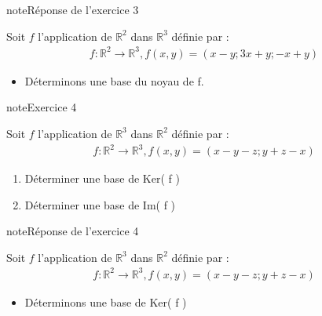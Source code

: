 \documentclass[letterpaper,10pt,french]{jupyterBook}
\begin{document}
\begin{sphinxadmonition}{note}{Réponse de l’exercice 3}

\sphinxAtStartPar
Soit \(f\) l’application de \(\mathbb{R}^2\) dans \(\mathbb{R}^3\) définie par :
\begin{equation*}
\begin{split}
f : \mathbb{R}^2 \rightarrow \mathbb{R}^3, f(x, y) = (x - y; 3x + y; -x + y )
\end{split}
\end{equation*}\begin{itemize}
\item {} 
\sphinxAtStartPar
Déterminons une base du noyau de f.

\end{itemize}
\end{sphinxadmonition}

\begin{sphinxadmonition}{note}{Exercice 4}

\sphinxAtStartPar
Soit \(f\) l’application de \(\mathbb{R}^3\) dans \(\mathbb{R}^2\) définie par :
\begin{equation*}
\begin{split}
f : \mathbb{R}^2 \rightarrow \mathbb{R}^3, f(x, y) = (x - y -z; y + z -x  )
\end{split}
\end{equation*}\begin{enumerate}
%
\item {} 
\sphinxAtStartPar
Déterminer une base de Ker( f )

\item {} 
\sphinxAtStartPar
Déterminer une base de Im( f )

\end{enumerate}
\end{sphinxadmonition}

\begin{sphinxadmonition}{note}{Réponse de l’exercice 4}

\sphinxAtStartPar
Soit \(f\) l’application de \(\mathbb{R}^3\) dans \(\mathbb{R}^2\) définie par :
\begin{equation*}
\begin{split}
f : \mathbb{R}^2 \rightarrow \mathbb{R}^3, f(x, y) = (x - y -z; y + z -x  )
\end{split}
\end{equation*}\begin{itemize}
\item {} 
\sphinxAtStartPar
Déterminons une base de Ker( f )

\end{itemize}
\end{sphinxadmonition}
\end{document}

